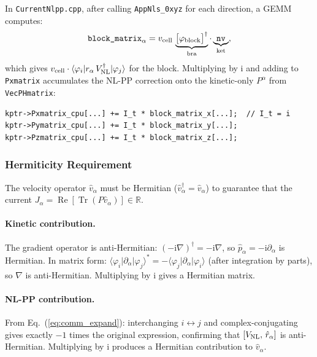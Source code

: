 \documentclass[12pt,letterpaper]{article}
\newcommand{\mel}[3]{\langle #1 \vert #2 \vert #3 \rangle}
\newcommand{\comm}[2]{\left[ #1,\, #2 \right]}
\newcommand{\ii}{\mathrm{i}}
\newcommand{\VNL}{V_{\rm NL}}
\begin{document}
In \texttt{CurrentNlpp.cpp}, after calling \texttt{AppNls\_0xyz} for each
direction, a GEMM computes:
\begin{equation}
  \texttt{block\_matrix}_\alpha = v_{\rm cell}\,
  \underbrace{\bigl[\varphi_{\rm block}\bigr]^\dagger}_{\text{bra}} \cdot
  \underbrace{\texttt{nv}}_{\text{ket}},
  \label{eq:nlpp_gemm}
\end{equation}
which gives $v_{\rm cell}\cdot\mel{\varphi_i}{r_\alpha\,\VNL^\dagger}{\varphi_j}$ for
the block.  Multiplying by $\ii$ and adding to \texttt{Pxmatrix} accumulates
the NL-PP correction onto the kinetic-only $P^\alpha$ from \texttt{VecPHmatrix}:
\begin{lstlisting}[style=cppstyle, caption={Accumulation in CurrentNlpp.cpp (upper triangle)}]
kptr->Pxmatrix_cpu[...] += I_t * block_matrix_x[...];  // I_t = i
kptr->Pymatrix_cpu[...] += I_t * block_matrix_y[...];
kptr->Pzmatrix_cpu[...] += I_t * block_matrix_z[...];
\end{lstlisting}

\subsubsection{Hermiticity Requirement}
\label{sec:pp:hermiticity}

The velocity operator $\hat{v}_\alpha$ must be Hermitian ($\hat{v}_\alpha^\dagger = \hat{v}_\alpha$)
to guarantee that the current $J_\alpha = \operatorname{Re}[\operatorname{Tr}(P\hat{v}_\alpha)] \in \mathbb{R}$.

\paragraph{Kinetic contribution.}
The gradient operator is anti-Hermitian: $(-\ii\nabla)^\dagger = -\ii\nabla$, so
$\hat{p}_\alpha = -\ii\partial_\alpha$ is Hermitian.
In matrix form: $\mel{\varphi_i}{\partial_\alpha}{\varphi_j}^* = -\mel{\varphi_j}{\partial_\alpha}{\varphi_i}$
(after integration by parts), so $\nabla$ is anti-Hermitian.  Multiplying by $\ii$
gives a Hermitian matrix.

\paragraph{NL-PP contribution.}
From Eq.~(\ref{eq:comm_expand}): interchanging $i \leftrightarrow j$ and
complex-conjugating gives exactly $-1$ times the original expression, confirming
that $\comm{\VNL}{\hat{r}_\alpha}$ is anti-Hermitian.  Multiplying by $\ii$
produces a Hermitian contribution to $\hat{v}_\alpha$.
\end{document}
